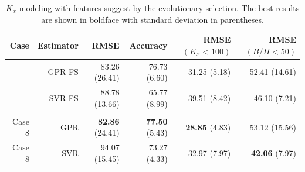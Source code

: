 \documentclass[a4paper,12pt, english]{article}
\begin{document}
 
\begin{table}[!htb]
\centering
\caption{\label{tab:results_new_set}  
$K_x$ modeling with features suggest  by the evolutionary selection.
The best results are shown in boldface with standard deviation in parentheses. 
}
\begin{tabular}{rrrrrr}
\hline
Case      & Estimator &                 RMSE &           Accuracy   &    RMSE$(K_x<100)$ &       RMSE$(B/H<50)$    \\\hline                                                               
   --     &    GPR-FS &   {     83.26} (26.41) & {     76.73} (6.60) &       31.25 (5.18) &        52.41 (14.61)   \\
   --     &    SVR-FS &          88.78 (13.66) &        65.77 (8.99) &       39.51 (8.42) &    {     46.10} (7.21) \\\\
 Case 8 &       GPR &  { \bf 82.86} (24.41) &  { \bf 77.50} (5.43)&  { \bf 28.85} (4.83) &        53.12 (15.56)  \\
 Case 8 &       SVR &         94.07 (15.45) &         73.27 (4.33)&         32.97 (7.97) &  { \bf  42.06} (7.97)  \\
\hline 
\end{tabular} 
\end{table}
\end{document}
